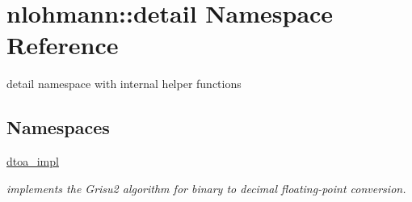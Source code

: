 \hypertarget{namespacenlohmann_1_1detail}{}\section{nlohmann\+::detail Namespace Reference}
\label{namespacenlohmann_1_1detail}


detail namespace with internal helper functions  


\subsection*{Namespaces}
\begin{DoxyCompactItemize}
\item 
 \mbox{\hyperlink{namespacenlohmann_1_1detail_1_1dtoa__impl}{dtoa\+\_\+impl}}
\begin{DoxyCompactList}\small\item\em implements the Grisu2 algorithm for binary to decimal floating-\/point conversion. \end{DoxyCompactList}\end{DoxyCompactItemize}
